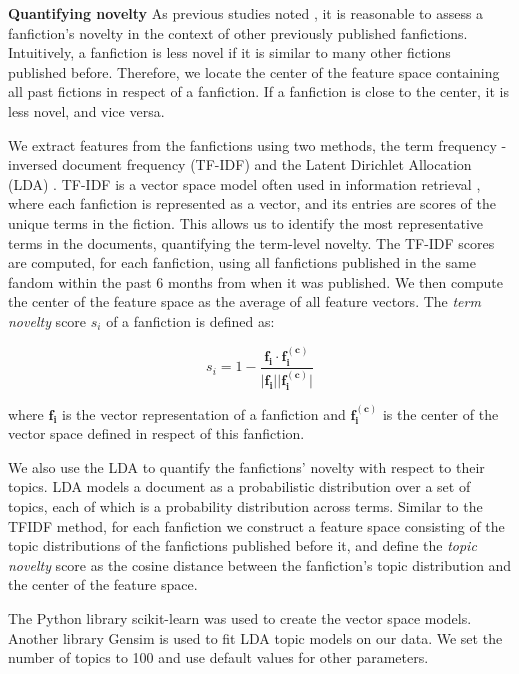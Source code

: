 \documentclass[letterpaper]{article} %
\begin{document}
\textbf{Quantifying novelty}   As previous studies noted \cite{askin2017makes} \cite{de2015game}, it is reasonable to assess a fanfiction's novelty in the context of other previously published fanfictions. Intuitively, a fanfiction is less novel if it is similar to many other fictions published before. Therefore, we locate the center of the feature space containing all past fictions in respect of a fanfiction. If a fanfiction is close to the center, it is less novel, and vice versa.

We extract features from the fanfictions using two methods, the term frequency - inversed document frequency (TF-IDF) and the Latent Dirichlet Allocation (LDA) \cite{blei2003latent}. TF-IDF is a vector space model often used in information retrieval \cite{turney2010frequency}, where each fanfiction is represented as a vector, and its entries are scores of the unique terms in the fiction. This allows us to identify the most representative terms in the documents, quantifying the term-level novelty. The TF-IDF scores are computed, for each fanfiction, using all fanfictions published in the same fandom within the past 6 months from when it was published. We then compute the center of the feature space as the average of all feature vectors. The \emph{term novelty} score $s_i$ of a fanfiction is defined as:

\begin{equation}
s_i = 1-\frac{\boldsymbol{f_i} \cdot{\boldsymbol{f_i^{(c)}}}} {\lvert \boldsymbol{f_i} \rvert \lvert \boldsymbol{f_i^{(c)}} \rvert}
\end{equation}

where $\boldsymbol{f_i}$ is the vector representation of a fanfiction and $\boldsymbol{f_i^{(c)}}$ is the center of the vector space defined in respect of this fanfiction.

We also use the LDA to quantify the fanfictions' novelty with respect to their topics. LDA models a document as a probabilistic distribution over a set of topics, each of which is a probability distribution across terms. Similar to the TFIDF method, for each fanfiction we construct a feature space consisting of the topic distributions of the fanfictions published before it, and define the \emph{topic novelty} score as the cosine distance between the fanfiction's topic distribution and the center of the feature space. 

The Python library scikit-learn was used to create the vector space models. Another library Gensim is used to fit LDA topic models on our data. We set the number of topics to 100 and use default values for other parameters. 
\end{document}
